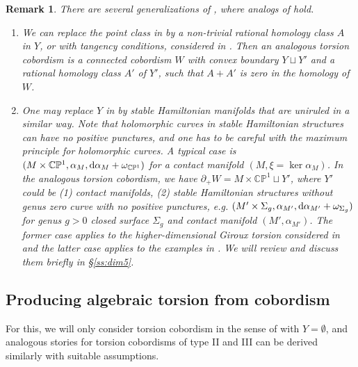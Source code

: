 \documentclass[11pt]{amsart}
\numberwithin{equation}{section}
\newtheorem{remark}[theorem]{\textbf{Remark}}
\newcommand{\CP}{\mathbb{C}\mathbb{P}}
\def\rd{{\rm d}}
\begin{document}
\begin{remark}
  There are several generalizations of , where analogs of  hold.
  \begin{enumerate}
      \item We can replace the point class in  by a non-trivial rational homology class $A$ in $Y$, or with tangency conditions, considered in \cite[\S 5.1]{moreno2024rsft}. Then an analogous torsion cobordism is a connected cobordism $W$ with convex boundary $Y\sqcup Y'$ and a rational homology class $A'$ of $Y'$, such that $A+A'$ is zero in the homology of $W$.
      \item One may replace $Y$ in  by stable Hamiltonian manifolds that are uniruled in a similar way. Note that holomorphic curves in stable Hamiltonian structures can have no positive punctures, and one has to be careful with the maximum principle for holomorphic curves. A typical case is $(M\times \CP^1,\alpha_M,\rd \alpha_M +\omega_{\CP^1})$ for a contact manifold $(M,\xi=\ker \alpha_M)$. In the analogous torsion cobordism, we have $\partial_+W=M\times \CP^1 \sqcup Y'$, where $Y'$ could be (1) contact manifolds, (2) stable Hamiltonian structures without genus zero curve with no positive punctures, e.g. $(M'\times \Sigma_{g},\alpha_{M'},\rd \alpha_{M'}+\omega_{\Sigma_g})$ for genus $g>0$ closed surface $\Sigma_g$ and contact manifold $(M',\alpha_{M'})$. The former case applies to the higher-dimensional Giroux torsion considered in \cite{MNW} and the latter case applies to the examples in \cite[Theroem 1.3]{moreno2019algebraic}. We will review and discuss them briefly in \S \ref{ss:dim5}. 
  \end{enumerate}
\end{remark}

\subsection{Producing algebraic torsion from cobordism}
For this, we will only consider torsion cobordism in the sense of  with $Y=\emptyset$, and analogous stories for torsion cobordisms of type II and III can be derived similarly with suitable assumptions. 
\end{document}
